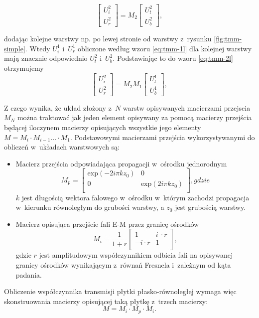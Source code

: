 \begin{equation}
	\begin{bmatrix}
	U_i^2 \\ 
	U_r^2
	\end{bmatrix}
	= M_2 
	\begin{bmatrix}
	U_t^2 \\
	U_b^2
	\end{bmatrix},
\label{eq:tmm-2l}
\end{equation}

dodając kolejne warstwy np. po lewej stronie od warstwy z~rysunku \ref{fig:tmm-simple}. Wtedy $U_i^1$ i~$U_r^1$ obliczone według wzoru \ref{eq:tmm-1l} dla kolejnej warstwy mają znacznie odpowiednio $U_t^2$ i~$U_b^2$. Podstawiając to do wzoru \ref{eq:tmm-2l} otrzymujemy 
\begin{equation}
\begin{bmatrix}
U_i^2 \\ 
U_r^2
\end{bmatrix}
=M_2 M_1 
\begin{bmatrix}
U_t^1 \\
U_b^1
\end{bmatrix},
\label{eq:tmm-2ls}
\end{equation}

Z czego wynika, że układ złożony z~$N$ warstw opisywanych macierzami przejscia $M_N$ można traktować jak jeden element opisywany za pomocą macierzy przejścia będącej iloczynem macierzy opisujących wszystkie jego elementy $M= M_i \cdot M_{i-1} ... \cdot M_1$. Podstawowymi macierzami przejścia wykorzystywanymi do obliczeń w~układach warstwowych są:
\begin{itemize}
\item Macierz przejścia odpowiadająca propagacji w~ośrodku jednorodnym 
\begin{equation}
	M_p=
	\begin{bmatrix}
	\textrm{exp}(-2i\pi k z_0) & 0 \\
	0	&\textrm{exp}(2i\pi k z_0)\\
	\end{bmatrix},gdzie
\end{equation}
$k$ jest długością wektora falowego w~ośrodku w~którym zachodzi propagacja w~kierunku równoległym do grubości warstwy, a $z_0$ jest grubością warstwy.
\item Macierz opisująca przejście fali E-M przez granicę ośrodków
\begin{equation}
	M_i=\frac{1}{1+r}
	\begin{bmatrix}
	1 & i~\cdot r \\
	-i \cdot r & 1\\
	\end{bmatrix},
\end{equation}
gdzie $r$ jest amplitudowym współczynnikiem odbicia fali na opisywanej granicy ośrodków wynikającym z~równań Fresnela i~zależnym od kąta padania. 
\end{itemize}

Obliczenie współczynnika transmisji płytki płasko-równoległej wymaga więc skonstruowania macierzy opisującej taką płytkę z~trzech macierzy: 
\[
M=M_i \cdot M_p \cdot  M_i.
\]

